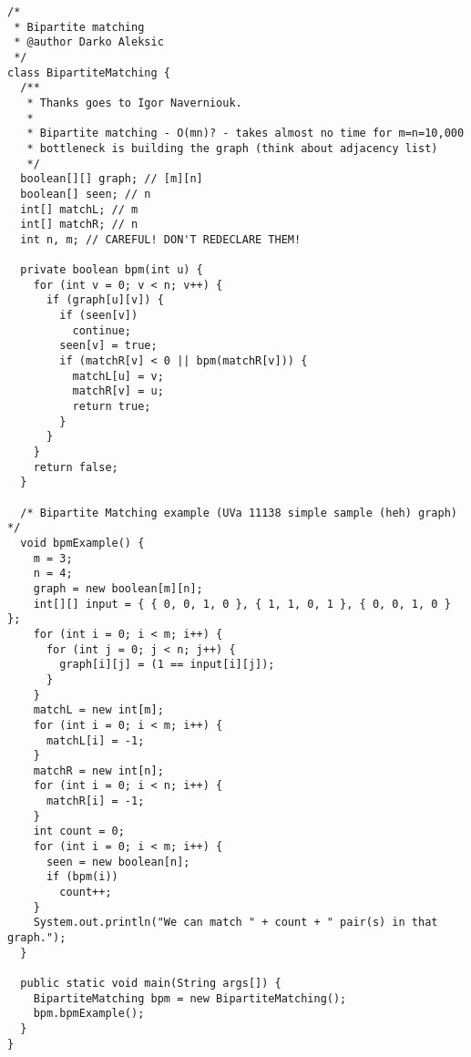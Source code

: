 \documentclass{article}
\begin{document}
    \begin{verbatim}
/*
 * Bipartite matching
 * @author Darko Aleksic
 */
class BipartiteMatching {
  /**
   * Thanks goes to Igor Naverniouk.
   * 
   * Bipartite matching - O(mn)? - takes almost no time for m=n=10,000
   * bottleneck is building the graph (think about adjacency list)
   */
  boolean[][] graph; // [m][n]
  boolean[] seen; // n
  int[] matchL; // m
  int[] matchR; // n
  int n, m; // CAREFUL! DON'T REDECLARE THEM!

  private boolean bpm(int u) {
    for (int v = 0; v < n; v++) {
      if (graph[u][v]) {
        if (seen[v])
          continue;
        seen[v] = true;
        if (matchR[v] < 0 || bpm(matchR[v])) {
          matchL[u] = v;
          matchR[v] = u;
          return true;
        }
      }
    }
    return false;
  }

  /* Bipartite Matching example (UVa 11138 simple sample (heh) graph) */
  void bpmExample() {
    m = 3;
    n = 4;
    graph = new boolean[m][n];
    int[][] input = { { 0, 0, 1, 0 }, { 1, 1, 0, 1 }, { 0, 0, 1, 0 } };
    for (int i = 0; i < m; i++) {
      for (int j = 0; j < n; j++) {
        graph[i][j] = (1 == input[i][j]);
      }
    }
    matchL = new int[m];
    for (int i = 0; i < m; i++) {
      matchL[i] = -1;
    }
    matchR = new int[n];
    for (int i = 0; i < n; i++) {
      matchR[i] = -1;
    }
    int count = 0;
    for (int i = 0; i < m; i++) {
      seen = new boolean[n];
      if (bpm(i))
        count++;
    }
    System.out.println("We can match " + count + " pair(s) in that graph.");
  }

  public static void main(String args[]) {
    BipartiteMatching bpm = new BipartiteMatching();
    bpm.bpmExample();
  }
}

    \end{verbatim}
\end{document}

